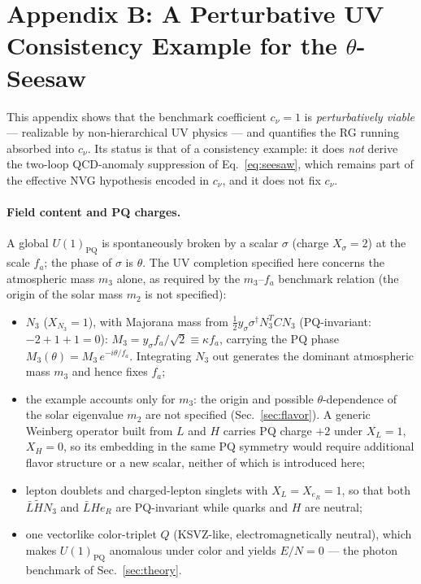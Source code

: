 \documentclass[11pt,a4paper]{article}
\begin{document}
\section*{Appendix B: A Perturbative UV Consistency Example for the $\theta$-Seesaw}
\label{app:uv}

This appendix shows that the benchmark coefficient $c_\nu = 1$ is
\emph{perturbatively viable} --- realizable by non-hierarchical UV physics ---
and quantifies the RG running absorbed into $c_\nu$. Its status is that of a
consistency example: it does \emph{not} derive the two-loop QCD-anomaly
suppression of Eq.~\eqref{eq:seesaw}, which remains part of the effective
NVG hypothesis encoded in $c_\nu$, and it does not fix $c_\nu$.

\paragraph{Field content and PQ charges.} A global $U(1)_{\mathrm{PQ}}$ is
spontaneously broken by a scalar $\sigma$ (charge $X_\sigma = 2$) at the
scale $f_a$; the phase of $\sigma$ is $\theta$. The UV completion specified
here concerns the atmospheric mass $m_3$ alone, as required by the
$m_3$--$f_a$ benchmark relation (the origin of the solar mass $m_2$ is
not specified):
\begin{itemize}
\item $N_3$ ($X_{N_3} = 1$), with Majorana mass from
$\frac{1}{2}y_\sigma\sigma^{\dagger} N_3^{T}CN_3$
(PQ-invariant: $-2 + 1 + 1 = 0$):
$M_3 = y_\sigma f_a/\sqrt{2} \equiv \kappa f_a$, carrying the PQ phase
$M_3(\theta) = M_3\,e^{-i\theta/f_a}$. Integrating $N_3$ out generates the
dominant atmospheric mass $m_3$ and hence fixes $f_a$;
\item the example accounts only for $m_3$: the origin and possible
$\theta$-dependence of the solar eigenvalue $m_2$ are not specified
(Sec.~\ref{sec:flavor}). A generic Weinberg operator built from $L$ and
$H$ carries PQ charge $+2$ under $X_L = 1$, $X_H = 0$, so its embedding in
the same PQ symmetry would require additional flavor structure or a new
scalar, neither of which is introduced here;
\item lepton doublets and charged-lepton singlets with $X_L = X_{e_R} = 1$,
so that both $\bar L \tilde H N_3$ and $\bar L H e_R$ are PQ-invariant while
quarks and $H$ are neutral;
\item one vectorlike color-triplet $Q$ (KSVZ-like, electromagnetically
neutral), which makes $U(1)_{\mathrm{PQ}}$ anomalous under color and yields
$E/N = 0$ --- the photon benchmark of Sec.~\ref{sec:theory}.
\end{itemize}
\end{document}
